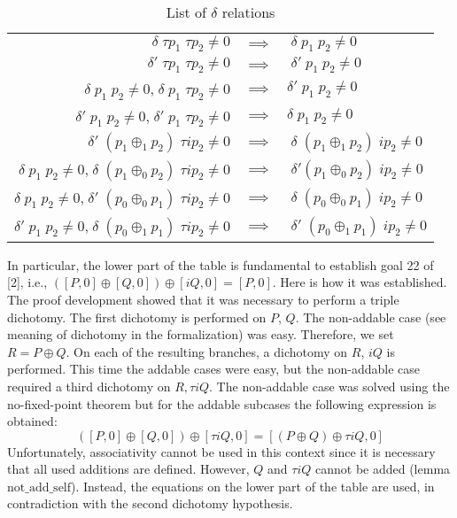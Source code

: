 \documentclass{llncs}
\begin{document}
\begin{table}
\begin{center}
\begin{tabular}{ r c l }
  $\delta \; \tau p_1 \; \tau p_2 \neq 0$
  & $\implies$ & $\; \delta \; p_1 \; p_2 \neq 0$ \\ 
  $\delta' \; \tau p_1 \; \tau p_2 \neq 0$
  & $\implies$ & $\; \delta' \; p_1 \; p_2 \neq 0$ \\ 
  $\delta \; p_1 \; p_2 \neq 0$,$\; \delta \; p_1 \; \tau p_2 \neq 0$
  & $\implies$ & $\delta' \; p_1 \; p_2 \neq 0$ \\ 
  $\delta' \; p_1 \; p_2 \neq 0$,$\; \delta' \; p_1 \; \tau p_2 \neq 0$
  & $\implies$ & $\delta \; p_1 \;p_2 \neq 0$ \\
%  
  \hline
%
  $\delta' \; (p_1 \oplus_1 p_2) \; \tau i p_2 \neq 0$
  & $\implies$ & $\; \delta \; (p_1 \oplus_1 p_2) \; i p_2 \neq 0$ \\ 
  $\delta \; p_1 \; p_2 \neq 0$,$\; \delta \; (p_1 \oplus_0 p_2) \; \tau i p_2 \neq 0$
  & $\implies$ & $\; \delta' (p_1 \oplus_0 p_2) \; i p_2 \neq 0$ \\ 
  $\delta \; p_1 \; p_2 \neq 0$,$\; \delta' \; (p_0 \oplus_0 p_1) \; \tau i p_2 \neq 0$
  & $\implies$ & $\; \delta \; (p_0 \oplus_0 p_1) \; i p_2 \neq 0$ \\ 	    
  $\delta' \; p_1 \; p_2 \neq 0$,$\; \delta \; (p_0 \oplus_1 p_1) \; \tau i p_2 \neq 0$
  & $\implies$ & $\; \delta' \; (p_0 \oplus_1 p_1) \; i p_2 \neq 0$ \\
\end{tabular}
\end{center}
	\caption{List of $\delta$ relations}
	\label{table:1}
\end{table}
%
In particular, the lower part of the table is fundamental to establish
goal 22 of [2], i.e., $([P,0] \oplus [Q,0]) \oplus [iQ,0] =
[P,0]$. Here is how it was established. The proof development showed
that it was necessary to perform a triple dichotomy. The first
dichotomy is performed on $P$, $Q$. The non-addable case (see meaning
of dichotomy in the formalization) was easy. Therefore, we set $R = P
\oplus Q$. On each of the resulting branches, a dichotomy on $R$, $iQ$
is performed. This time the addable cases were easy, but the
non-addable case required a third dichotomy on $R,\tau i Q$. The
non-addable case was solved using the no-fixed-point theorem but for
the addable subcases the following expression is obtained:
\[
([P,0] \oplus [Q,0]) \oplus [\tau i Q,0] =
  [(P \oplus Q) \oplus \tau i Q,0]
\]
Unfortunately, associativity cannot be used in this context since it
is necessary that all used additions are defined. However, $Q$ and
$\tau i Q$ cannot be added (lemma $\text{not\_add\_self}$). Instead,
the equations on the lower part of the table are used, in
contradiction with the second dichotomy hypothesis.
\end{document}
